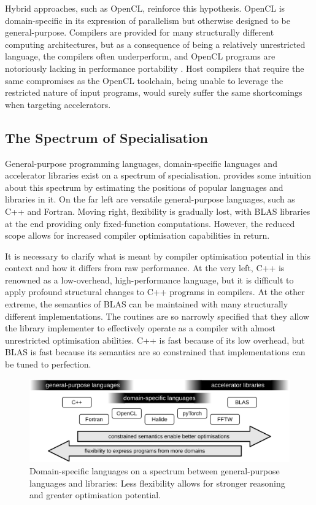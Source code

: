     Hybrid approaches, such as OpenCL, reinforce this hypothesis.
    OpenCL is domain-specific in its expression of parallelism but otherwise
    designed to be general-purpose.
    Compilers are provided for many structurally different computing
    architectures, but as a consequence of being a relatively unrestricted
    language, the compilers often underperform, and OpenCL programs are
    notoriously lacking in performance portability
    \citep{Falch:2015:MLB:2863697.2864570}.
    Host compilers that require the same compromises as the OpenCL toolchain,
    being unable to leverage the restricted nature of input programs, would
    surely suffer the same shortcomings when targeting accelerators.

\subsection{The Spectrum of Specialisation}

    General-purpose programming languages, domain-specific languages and
    accelerator libraries exist on a spectrum of specialisation.
     provides some intuition about this spectrum by
    estimating the positions of popular languages and libraries in it.
    On the far left are versatile general-purpose languages, such as C++ and
    Fortran.
    Moving right, flexibility is gradually lost, with BLAS libraries at
    the end providing only fixed-function computations.
    However, the reduced scope allows for increased compiler optimisation
    capabilities in return.

    It is necessary to clarify what is meant by compiler optimisation potential
    in this context and how it differs from raw performance.
    At the very left, C++ is renowned as a low-overhead, high-performance
    language, but it is difficult to apply profound structural changes to C++
    programs in compilers.
    At the other extreme, the semantics of BLAS can be maintained with many
    structurally different implementations.
    The routines are so narrowly specified that they allow the library
    implementer to effectively operate as a compiler with almost
    unrestricted optimisation abilities.
    C++ is fast because of its low overhead, but BLAS is fast because
    its semantics are so constrained that implementations can be tuned to
    perfection.

\begin{figure}[t]
\centering
\includegraphics[width=\textwidth]{figures/DSLgradient}
\caption{Domain-specific languages on a spectrum between general-purpose
         languages and libraries:
         Less flexibility allows for stronger reasoning and greater
         optimisation potential.}
\label{specialgradient}
\end{figure}

